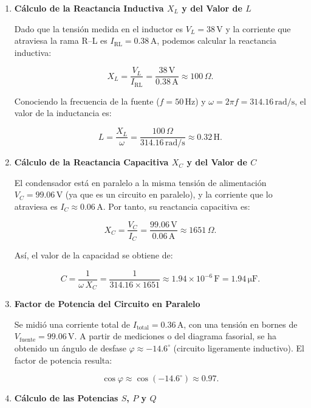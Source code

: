\documentclass{article}
\begin{document}
\begin{enumerate}
    \item \textbf{Cálculo de la Reactancia Inductiva $X_L$ y del Valor de $L$}

    Dado que la tensión medida en el inductor es $V_L = 38\,\si{\volt}$ y la corriente que atraviesa la rama R--L es 
    $I_{\text{RL}} = 0.38\,\si{\ampere}$, podemos calcular la reactancia inductiva:

    \[
    X_L = \frac{V_L}{I_{\text{RL}}} 
         = \frac{38\,\si{\volt}}{0.38\,\si{\ampere}}
         \approx 100\,\Omega.
    \]

    Conociendo la frecuencia de la fuente ($f=50\,\si{\hertz}$) y 
    $\omega = 2\pi f = 314.16\,\si{\radian/\second}$, el valor de la inductancia es:

    \[
    L = \frac{X_L}{\omega}
       = \frac{100\,\Omega}{314.16\,\si{\radian/\second}}
       \approx 0.32\,\si{\henry}.
    \]

    \item \textbf{Cálculo de la Reactancia Capacitiva $X_C$ y del Valor de $C$}

    El condensador está en paralelo a la misma tensión de alimentación 
    $V_C = 99.06\,\si{\volt}$ (ya que es un circuito en paralelo), y la corriente que lo atraviesa es $I_C \approx 0.06\,\si{\ampere}$.  
    Por tanto, su reactancia capacitiva es:

    \[
    X_C = \frac{V_C}{I_C} 
         = \frac{99.06\,\si{\volt}}{0.06\,\si{\ampere}}
         \approx 1651\,\Omega.
    \]

    Así, el valor de la capacidad se obtiene de:

    \[
    C = \frac{1}{\omega\,X_C}
       = \frac{1}{314.16 \times 1651}
       \approx 1.94\times 10^{-6}\,\si{\farad}
       = 1.94\,\si{\micro\farad}.
    \]

    \item \textbf{Factor de Potencia del Circuito en Paralelo}

    Se midió una corriente total de $I_{\text{total}} = 0.36\,\si{\ampere}$, 
    con una tensión en bornes de $V_{\text{fuente}} = 99.06\,\si{\volt}$.  
    A partir de mediciones o del diagrama fasorial, se ha obtenido 
    un ángulo de desfase $\varphi \approx -14.6^\circ$ (circuito ligeramente inductivo).  
    El factor de potencia resulta:

    \[
    \cos\varphi \approx \cos(-14.6^\circ) \approx 0.97.
    \]

    \item \textbf{Cálculo de las Potencias $S$, $P$ y $Q$}


\end{enumerate}
\end{document}
